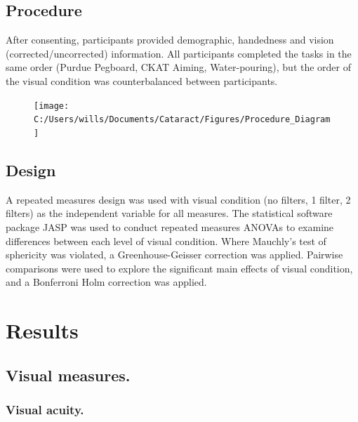\documentclass[
  english,
  man,floatsintext]{apa6}
\begin{document}
\hypertarget{procedure-1}{%
\subsection{Procedure}\label{procedure-1}}

After consenting, participants provided demographic, handedness and vision (corrected/uncorrected) information.
All participants completed the tasks in the same order (Purdue Pegboard, CKAT Aiming, Water-pouring), but the order of the visual condition was counterbalanced between participants.

\begin{figure}

{\centering \texttt{[image: C:/Users/wills/Documents/Cataract/Figures/Procedure\_Diagram]} 

}

\caption{ }\label{fig:unnamed-chunk-4}
\end{figure}

\hypertarget{design-1}{%
\subsection{Design}\label{design-1}}

A repeated measures design was used with visual condition (no filters, 1 filter, 2 filters) as the independent variable for all measures.
The statistical software package JASP was used to conduct repeated measures ANOVAs to examine differences between each level of visual condition.
Where Mauchly's test of sphericity was violated, a Greenhouse-Geisser correction was applied.
Pairwise comparisons were used to explore the significant main effects of visual condition, and a Bonferroni Holm correction was applied.

\hypertarget{results-1}{%
\section{Results}\label{results-1}}

\hypertarget{visual-measures.}{%
\subsection{Visual measures.}\label{visual-measures.}}

\hypertarget{visual-acuity.}{%
\subsubsection{Visual acuity.}\label{visual-acuity.}}
\end{document}
